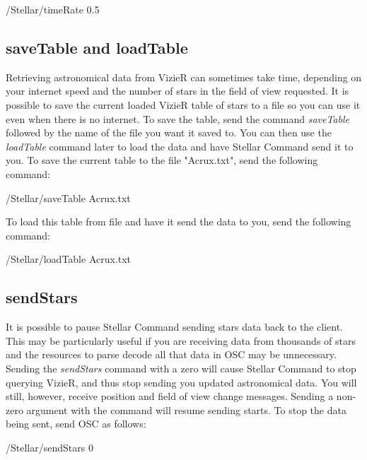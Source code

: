 \begin{syntax}	
	\medskip
	/Stellar/timeRate 0.5
	\medskip
\end{syntax}

\subsection{saveTable and loadTable}
Retrieving astronomical data from VizieR can sometimes take time, depending on your internet speed and the number of stars in the field of view requested. It is possible to save the current loaded VizieR table of stars to a file so you can use it even when there is no internet. To save the table, send the command \textit{saveTable} followed by the name of the file you want it saved to. You can then use the \textit{loadTable} command later to load the data and have Stellar Command send it to you.
To save the current table to the file "Acrux.txt", send the following command:
 
 \begin{syntax}	
 	\medskip
 	/Stellar/saveTable Acrux.txt
 	\medskip
 \end{syntax}

To load this table from file and have it send the data to you, send the following command:
 \begin{syntax}	
	\medskip
	/Stellar/loadTable Acrux.txt
	\medskip
\end{syntax}

\subsection{sendStars}
It is possible to pause Stellar Command sending stars data back to the client. This may be particularly useful if you are receiving data from thousands of stars and the resources to parse decode all that data in OSC may be unnecessary. Sending the \textit{sendStars} command with a zero will cause Stellar Command to stop querying VizieR, and thus stop sending you updated astronomical data. You will still, however, receive position and field of view change messages. Sending a non-zero argument with the command will resume sending starts. To stop the data being sent, send OSC as follows:

 \begin{syntax}	
	\medskip
	/Stellar/sendStars 0
	\medskip
\end{syntax}  

